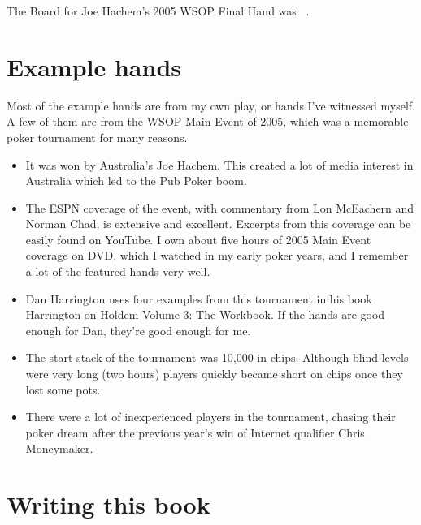 The Board for Joe Hachem's 2005 WSOP Final Hand was
\sixh\fived\fourd\As\fourc\ .

\section*{Example hands}

Most of the example hands are from my own play, or hands I've
witnessed myself. A few of them are from the WSOP Main Event
of 2005, which was a memorable poker tournament for many reasons.

\begin{itemize}
  \item It was won by Australia's Joe Hachem. This created a lot of
    media interest in Australia which led to the Pub Poker boom.
  \item The ESPN coverage of the event, with commentary from
    Lon McEachern and Norman Chad, is extensive and
    excellent. Excerpts from this coverage can be easily found on
    YouTube. I own about five hours of 2005 Main Event coverage on
    DVD, which I watched in my early poker years, and I remember a lot
    of the featured hands very well.
  \item Dan Harrington uses four examples from this tournament in his
    book Harrington on Holdem Volume 3: The Workbook. If the hands are
    good enough for Dan, they're good enough for me.
  \item The start stack of the tournament was 10,000 in
    chips. Although blind levels were very long (two hours)
    players quickly became short on chips once they lost some pots.
  \item There were a lot of inexperienced players in the tournament,
    chasing their poker dream after the previous year's win of
    Internet qualifier Chris Moneymaker.
\end{itemize}


\section*{Writing this book}

